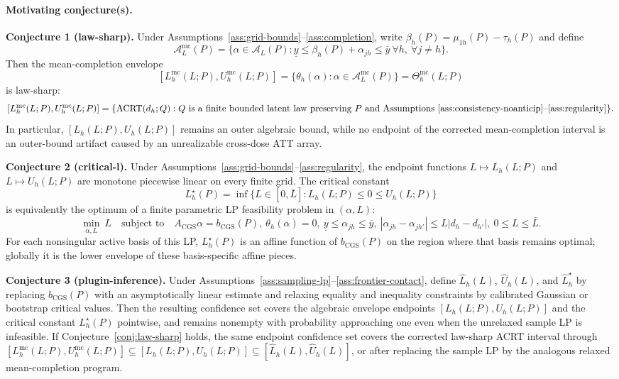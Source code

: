 \documentclass[11pt]{article}
\theoremstyle{definition}
\theoremstyle{plain}
\theoremstyle{remark}
\begin{document}
\paragraph{Motivating conjecture(s).}
\textbf{Conjecture 1 (law-sharp).} Under Assumptions~\ref{ass:grid-bounds}--\ref{ass:completion}, write
\(\beta_h(P)=\mu_{1h}(P)-\tau_h(P)\) and define
\[
  \mathcal A_L^{\mathrm{mc}}(P)=
  \{\alpha\in\mathcal A_L(P):
    \underline y\le \beta_h(P)+\alpha_{jh}\le \overline y
    \ \forall h,\ \forall j\neq h\}.
\]
Then the mean-completion envelope
\[
  [L_h^{\mathrm{mc}}(L;P),U_h^{\mathrm{mc}}(L;P)]
  =
  \{\theta_h(\alpha):\alpha\in\mathcal A_L^{\mathrm{mc}}(P)\}
  =
  \Theta_h^{\mathrm{mc}}(L;P)
\]
is law-sharp:
\[
  [L_h^{\mathrm{mc}}(L;P),U_h^{\mathrm{mc}}(L;P)]
  =
  \{\operatorname{ACRT}(d_h;Q):Q \text{ is a finite bounded latent law
  preserving } P \text{ and Assumptions } \ref{ass:consistency-noanticip}
  \text{--}\ref{ass:regularity}\}.
\]
In particular, \([L_h(L;P),U_h(L;P)]\) remains an outer algebraic bound, while
no endpoint of the corrected mean-completion interval is an outer-bound
artifact caused by an unrealizable cross-dose ATT array.

\textbf{Conjecture 2 (critical-l).} Under Assumptions~\ref{ass:grid-bounds}--\ref{ass:regularity}, the endpoint
functions \(L\mapsto L_h(L;P)\) and \(L\mapsto U_h(L;P)\) are monotone
piecewise linear on every finite grid.  The critical constant
\[
  L_h^\star(P)=\inf\{L\in[0,\bar L]:L_h(L;P)\le0\le U_h(L;P)\}
\]
is equivalently the optimum of a finite parametric LP feasibility problem in
\((\alpha,L)\):
\[
 \min_{\alpha,L}\ L
 \quad\text{subject to}\quad
 A_{\mathrm{CGS}}\alpha=b_{\mathrm{CGS}}(P),\ 
 \theta_h(\alpha)=0,\ 
 \underline y\le\alpha_{jh}\le\overline y,\ 
 |\alpha_{j h}-\alpha_{j h'}|\le L|d_h-d_{h'}|,\ 
 0\le L\le\bar L .
\]
For each nonsingular active basis of this LP, \(L_h^\star(P)\) is an affine
function of \(b_{\mathrm{CGS}}(P)\) on the region where that basis remains
optimal; globally it is the lower envelope of these basis-specific affine
pieces.

\textbf{Conjecture 3 (plugin-inference).} Under Assumptions~\ref{ass:sampling-lp}--\ref{ass:frontier-contact}, define
\(\widehat L_h(L)\), \(\widehat U_h(L)\), and
\(\widehat L_h^\star\) by replacing \(b_{\mathrm{CGS}}(P)\) with an
asymptotically linear estimate and relaxing equality and inequality
constraints by calibrated Gaussian or bootstrap critical values.  Then the
resulting confidence set covers the algebraic envelope endpoints
\([L_h(L;P),U_h(L;P)]\) and the critical constant \(L_h^\star(P)\) pointwise,
and remains nonempty with probability approaching one even when the unrelaxed
sample LP is infeasible.  If Conjecture~\ref{conj:law-sharp} holds, the same
endpoint confidence set covers the corrected law-sharp ACRT interval through
\([L_h^{\mathrm{mc}}(L;P),U_h^{\mathrm{mc}}(L;P)]
\subseteq [L_h(L;P),U_h(L;P)]\subseteq[\widehat L_h(L),\widehat U_h(L)]\), or
after replacing the sample LP by the analogous relaxed mean-completion
program.
\end{document}
